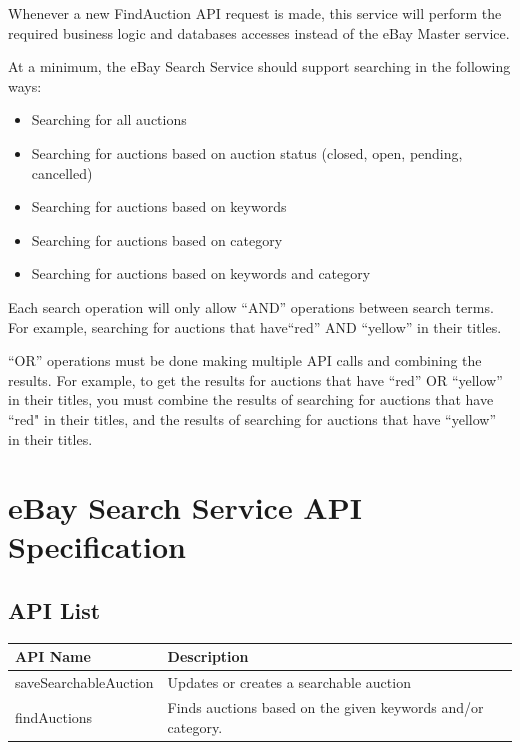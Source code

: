 \documentclass[12pt,a4paper]{article}
\begin{document}
Whenever a new FindAuction API request is made, 
this service will perform the required business logic and databases accesses 
instead of the eBay Master service.

\vspace{\baselineskip}


At a minimum, the eBay Search Service should support searching in the following ways:

\begin{itemize}
    \item Searching for all auctions
    \item Searching for auctions based on auction status (closed, open, pending, cancelled)
    \item Searching for auctions based on keywords
    \item Searching for auctions based on category
    \item Searching for auctions based on keywords and category
\end{itemize}

Each search operation will only allow ``AND'' operations between search terms. 
For example, searching for auctions that have``red'' AND ``yellow'' in their titles.
\vspace{\baselineskip}

``OR'' operations must be done making multiple API calls and combining the results.
For example, to get the results for auctions that have ``red'' OR ``yellow'' in their titles, 
you must combine the results of searching for auctions that have ``red" in their titles,
and the results of searching for auctions that have ``yellow'' in their titles.


\pagebreak

 
\section{eBay Search Service API Specification}

\subsection{API List}
\begin{center}
    \begin{tabular}{| l | l |}
        \hline
        \textbf{API Name} & \textbf{Description} \\
        \hline
            saveSearchableAuction & Updates or creates a searchable auction \\ 
        \hline
            findAuctions & Finds auctions based on the given keywords and/or category. \\
        \hline
    \end{tabular}
\end{center}
\end{document}
